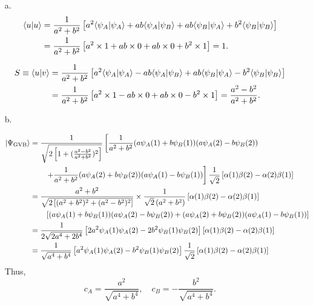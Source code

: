 \documentclass[a4paper]{book}
\begin{document}
	\begin{solution}
	
	\begin{enumerate}
	
	\item[a.]
	\begin{align}
		\langle u | u \rangle &= \frac{1}{ a^2+b^2 } \left[ a^2 \langle \psi_A | \psi_A \rangle + ab \langle \psi_A | \psi_B \rangle + ab \langle \psi_B | \psi_A \rangle + b^2 \langle \psi_B | \psi_B \rangle \right] \notag \\ 
		&= \frac{1}{ a^2+b^2 } \left[ a^2 \times 1 + ab \times 0 + ab \times 0 + b^2 \times 1 \right] = 1 .
	\end{align}
		
	\begin{align}
		S \equiv \langle u | v \rangle &= \frac{1}{ a^2+b^2 } \left[ a^2 \langle \psi_A | \psi_A \rangle - ab \langle \psi_A | \psi_B \rangle + ab \langle \psi_B | \psi_A \rangle - b^2 \langle \psi_B | \psi_B \rangle \right] \notag \\ 
		&= \frac{1}{ a^2+b^2 } \left[ a^2 \times 1 - ab \times 0 + ab \times 0 - b^2 \times 1 \right] = \frac{ a^2 - b^2 }{ a^2 + b^2 }.
	\end{align}
	
	\item[b.]
	
	\begin{align}
		| \Psi_{\rm GVB} \rangle &= \frac{1}{ \sqrt{ 2 \left[ 1 + ( \frac{ a^2 - b^2 }{ a^2 + b^2 } )^2 \right] } } \left[ \frac{1}{ a^2 + b^2 } ( a \psi_A(1) + b \psi_B(1) )( a \psi_A(2) - b \psi_B(2) ) \right. \notag \\
		&\hspace{2em} \left. + \frac{1}{ a^2 + b^2 } ( a \psi_A(2) + b \psi_B(2) )( a \psi_A(1) - b \psi_B(1) ) \right] \frac{1}{ \sqrt{2} } \left[ \alpha(1) \beta(2) - \alpha(2) \beta(1) \right] \notag \\
		&=\frac{ a^2 + b^2 }{ \sqrt{ 2 \left[ ( a^2 + b^2 )^2 + ( a^2 - b^2 )^2 \right] } } \times \frac{1}{ \sqrt{2} \left( a^2 + b^2 \right) } \left[ \alpha(1) \beta(2) - \alpha(2) \beta(1) \right] \notag \\
		&\hspace{2em}\left[ ( a \psi_A(1) + b \psi_B(1) )( a \psi_A(2) - b \psi_B(2) ) + ( a \psi_A(2) + b \psi_B(2) )( a \psi_A(1) - b \psi_B(1) ) \right] \notag \\ 
		&= \frac{ 1 }{ 2 \sqrt{ 2a^4 + 2b^4 } } \left[ 2 a^2 \psi_A(1) \psi_A(2) - 2 b^2 \psi_B(1) \psi_B(2) \right] \left[ \alpha(1) \beta(2) - \alpha(2) \beta(1) \right] \notag \\
		&= \frac{ 1 }{ \sqrt{ a^4 + b^4 } }  \left[ a^2 \psi_A(1) \psi_A(2) - b^2 \psi_B(1) \psi_B(2) \right] \frac{1}{ \sqrt{2} } \left[ \alpha(1) \beta(2) - \alpha(2) \beta(1) \right] 
	\end{align}
	Thus,
	\[
		c_A = \frac{ a^2 }{ \sqrt{ a^4 + b^4 } } , \quad c_B = -\frac{ b^2 }{ \sqrt{ a^4 + b^4 } }.
	\]
	\end{enumerate}		
		
	\end{solution}
	
\end{document}
